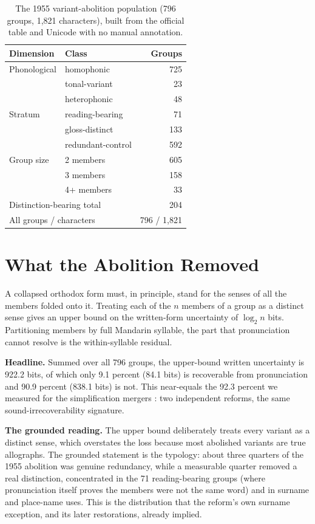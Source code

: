 \documentclass[10pt,twocolumn]{article}
\begin{document}
\begin{table}[t]
\centering\small
\caption{The 1955 variant-abolition population (796 groups, 1{,}821 characters),
built from the official table and Unicode with no manual annotation.}
\label{tab:typology}
\begin{tabular}{llr}
\toprule
Dimension & Class & Groups \\
\midrule
Phonological & homophonic & 725 \\
 & tonal-variant & 23 \\
 & heterophonic & 48 \\
\midrule
Stratum & reading-bearing & 71 \\
 & gloss-distinct & 133 \\
 & redundant-control & 592 \\
\midrule
Group size & 2 members & 605 \\
 & 3 members & 158 \\
 & 4+ members & 33 \\
\midrule
\multicolumn{2}{l}{Distinction-bearing total} & 204 \\
\multicolumn{2}{l}{All groups / characters} & 796 / 1{,}821 \\
\bottomrule
\end{tabular}
\end{table}

\section{What the Abolition Removed}
A collapsed orthodox form must, in principle, stand for the senses of all the
members folded onto it. Treating each of the $n$ members of a group as a distinct
sense \cite{shannon1948} gives an upper bound on the written-form uncertainty of
$\log_2 n$ bits. Partitioning members by full Mandarin syllable, the part that
pronunciation cannot resolve is the within-syllable residual.

\noindent\textbf{Headline.} Summed over all 796 groups, the upper-bound written
uncertainty is 922.2 bits, of which only 9.1 percent (84.1 bits) is recoverable
from pronunciation and 90.9 percent (838.1 bits) is not. This near-equals the
92.3 percent we measured for the simplification mergers
\cite{maity2025simplification}: two independent reforms, the same
sound-irrecoverability signature.

\noindent\textbf{The grounded reading.} The upper bound deliberately treats every
variant as a distinct sense, which overstates the loss because most abolished
variants are true allographs. The grounded statement is the typology: about three
quarters of the 1955 abolition was genuine redundancy, while a measurable quarter
removed a real distinction, concentrated in the 71 reading-bearing groups (where
pronunciation itself proves the members were not the same word) and in surname
and place-name uses. This is the distribution that the reform's own surname
exception, and its later restorations, already implied.
\end{document}
